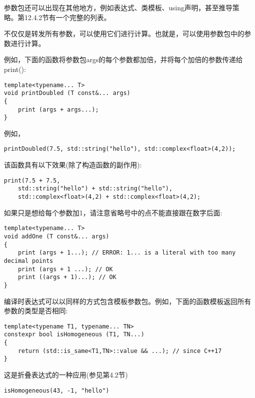 
参数包还可以出现在其他地方，例如表达式、类模板、using声明，甚至推导策略。第12.4.2节有一个完整的列表。


不仅仅是转发所有参数，可以使用它们进行计算。也就是，可以使用参数包中的参数进行计算。

例如，下面的函数将参数包args的每个参数都加倍，并将每个加倍的参数传递给print():

\begin{lstlisting}[style=styleCXX]
template<typename... T>
void printDoubled (T const&... args)
{
	print (args + args...);
}
\end{lstlisting}

例如，

\begin{lstlisting}[style=styleCXX]
printDoubled(7.5, std::string("hello"), std::complex<float>(4,2));
\end{lstlisting}

该函数具有以下效果(除了构造函数的副作用):

\begin{lstlisting}[style=styleCXX]
print(7.5 + 7.5,
	std::string("hello") + std::string("hello"),
	std::complex<float>(4,2) + std::complex<float>(4,2);
\end{lstlisting}

如果只是想给每个参数加1，请注意省略号中的点不能直接跟在数字后面:

\begin{lstlisting}[style=styleCXX]
template<typename... T>
void addOne (T const&... args)
{
	print (args + 1...); // ERROR: 1... is a literal with too many decimal points
	print (args + 1 ...); // OK
	print ((args + 1)...); // OK
}
\end{lstlisting}

编译时表达式可以以同样的方式包含模板参数包。例如，下面的函数模板返回所有参数的类型是否相同:

\begin{lstlisting}[style=styleCXX]
template<typename T1, typename... TN>
constexpr bool isHomogeneous (T1, TN...)
{
	return (std::is_same<T1,TN>::value && ...); // since C++17
}
\end{lstlisting}

这是折叠表达式的一种应用(参见第4.2节)

\begin{lstlisting}[style=styleCXX]
isHomogeneous(43, -1, "hello")
\end{lstlisting}

